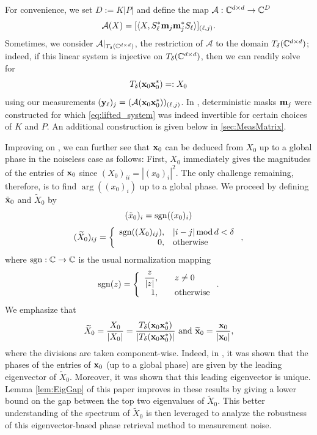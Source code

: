 For convenience, we set $D := K|P|$ and define the map $\mathcal{A} : \mathbb{C}^{d \times d} \to \mathbb{C}^D$ 
\begin{equation}\mathcal{A}(X) = [\langle X, S_\ell^* \mathbf m_j \mathbf m_j^* S_\ell \rangle]_{(\ell, j)}.\label{eq:linear}\end{equation}  
Sometimes, we consider $\mathcal{A}|_{T_{\delta}(\mathbb{C}^{d \times d})}$, the restriction of $\mathcal{A}$ to the domain $T_{\delta}(\mathbb{C}^{d \times d})$; indeed, if this linear system is injective on $T_\delta(\mathbb{C}^{d \times d})$, then we can readily solve for 
\begin{equation}T_\delta(\mathbf x_0 \mathbf x_0^*) =: X_0 \label{equdef:X0} \end{equation}  
using our measurements $(\mathbf y_\ell)_j = (\mathcal{A}(\mathbf x_0 \mathbf x_0^*))_{(\ell,j)}$.
In \cite{IVW2015_FastPhase}, deterministic masks $\mathbf m_j$ were constructed for which \eqref{eq:lifted_system} was indeed invertible for certain choices of $K$ and $P$.  An additional construction is given below in \cref{sec:MeasMatrix}.

Improving on \cite{IVW2015_FastPhase}, we can further see that $\mathbf x_0$ can be deduced from $X_0$ up to a global phase in the noiseless case as follows:  First, $X_0$ immediately gives the magnitudes of the entries of $\mathbf x_0$ since $(X_0)_{ii} = |(x_0)_i|^2$.  
The only challenge remaining, therefore, is to find $\arg((x_0)_i)$ up to a global phase.  We proceed by defining $\tilde{\mathbf x}_0$ and $\widetilde{X}_0$ by \[(\tilde{x}_0)_i = \mathrm{sgn}((x_0)_i)\] \[(\widetilde{X}_0)_{ij} = \left\{\begin{array}{r@{,\quad}l} \sgn((X_0)_{ij}) & |i - j| \mod d < \delta \\ 0 & \text{otherwise} \end{array}\right.,\] where $\mathrm{sgn} : \mathbb{C} \to \mathbb{C}$ is the usual normalization mapping \[\sgn(z) = \left\{\begin{array}{r@{,\qquad}l} \dfrac{z}{|z|} & z \neq 0 \\ 1 & \text{otherwise} \end{array}\right..\]  We emphasize that 
\begin{equation}
\tX_0= \frac{X_0}{|X_0|}= \frac{T_\delta(\x_0\x_0^*)}{|T_\delta(\x_0\x_0^*)|} \ \text{and} \ \widetilde{\x}_0 = \frac{\x_0}{|\x_0|},
\label{eq:X_0} 
\end{equation} 
where the divisions are taken component-wise.  Indeed, in \cite{IV_SPIE}, it was shown that the phases of the entries of $\mathbf x_0$ (up to a global phase) are given by the leading eigenvector of $\widetilde X_0$.  Moreover, it was shown that this leading eigenvector is unique.  Lemma \ref{lem:EigGap} of this paper improves in these results by giving a lower bound on the gap between the top two eigenvalues of $\widetilde X_0$.  This better understanding of the spectrum of $\widetilde X_0$ is then leveraged to analyze the robustness of this eigenvector-based phase retrieval method to measurement noise.

